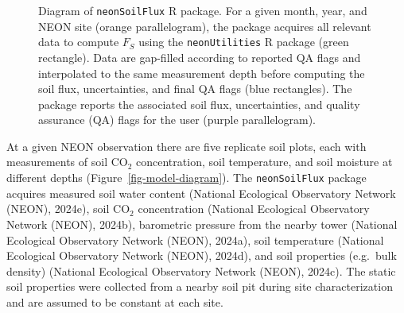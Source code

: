 \documentclass[
  letterpaper,
  DIV=11,
  numbers=noendperiod]{scrartcl}
\begin{document}
\begin{figure}


\caption{\label{fig-package-diagram}Diagram of \texttt{neonSoilFlux} R
package. For a given month, year, and NEON site (orange parallelogram),
the package acquires all relevant data to compute \(F_{S}\) using the
\texttt{neonUtilities} R package (green rectangle). Data are gap-filled
according to reported QA flags and interpolated to the same measurement
depth before computing the soil flux, uncertainties, and final QA flags
(blue rectangles). The package reports the associated soil flux,
uncertainties, and quality assurance (QA) flags for the user (purple
parallelogram).}

\end{figure}%

At a given NEON observation there are five replicate soil plots, each
with measurements of soil CO\(_{2}\) concentration, soil temperature,
and soil moisture at different depths (Figure~\ref{fig-model-diagram}).
The \texttt{neonSoilFlux} package acquires measured soil water content
(National Ecological Observatory Network (NEON), 2024e), soil CO\(_{2}\)
concentration (National Ecological Observatory Network (NEON), 2024b),
barometric pressure from the nearby tower (National Ecological
Observatory Network (NEON), 2024a), soil temperature (National
Ecological Observatory Network (NEON), 2024d), and soil properties
(e.g.~bulk density) (National Ecological Observatory Network (NEON),
2024c). The static soil properties were collected from a nearby soil pit
during site characterization and are assumed to be constant at each
site.
\end{document}
